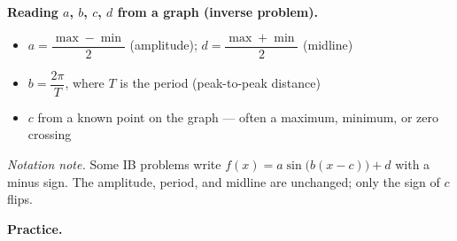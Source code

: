 \documentclass[12pt, twoside]{article}
\begin{document}
\textbf{Reading $a$, $b$, $c$, $d$ from a graph (inverse problem).}
\begin{itemize}[itemsep=0cm, topsep=0.05cm]
\item $a = \dfrac{\max - \min}{2}$ (amplitude); \quad $d = \dfrac{\max + \min}{2}$ (midline)
\item $b = \dfrac{2\pi}{T}$, where $T$ is the period (peak-to-peak distance)
\item $c$ from a known point on the graph --- often a maximum, minimum, or zero crossing
\end{itemize}

\textit{Notation note.} Some IB problems write $f(x) = a\sin\!\bigl(b(x - c)\bigr) + d$ with a minus sign. The amplitude, period, and midline are unchanged; only the sign of $c$ flips.

\newpage

\textbf{Practice.}
\end{document}
